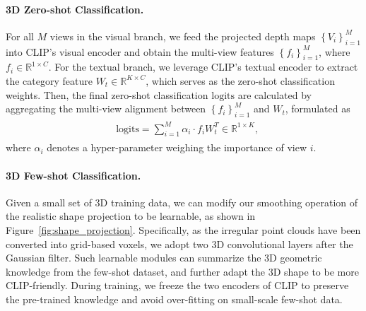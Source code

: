 \documentclass[10pt,twocolumn,letterpaper]{article}
\begin{document}
\paragraph{3D Zero-shot Classification.}
For all $M$ views in the visual branch, we feed the projected depth maps $\left\{V_{i} \right \}_{i=1}^{M}$ into CLIP's visual encoder and obtain the multi-view features $\left \{f_{i} \right \}_{i=1}^{M}$, where $f_{i} \in \mathbb{R}^{1 \times C}$.
For the textual branch, we leverage CLIP's textual encoder to extract the category feature $W_{t} \in \mathbb{R}^{K \times C}$, which serves as the zero-shot classification weights.
Then, the final zero-shot classification $\mathrm{logits}$ are calculated by aggregating the multi-view alignment between $\left \{f_{i} \right \}_{i=1}^{M}$ and $W_{t}$, formulated as
\begin{align}
\label{equa:zeroshot}
\begin{split}
    &\mathrm{logits} = \sum\nolimits_{i=1}^M{\alpha_i\cdot f_i W_t^T} \in \mathbb{R}^{1 \times K},
\end{split}
\end{align}
where $\alpha_i$ denotes a hyper-parameter weighing the importance of view $i$. 

\paragraph{3D Few-shot Classification.}
Given a small set of 3D training data, we can modify our smoothing operation of the realistic shape projection to be learnable, as shown in Figure~\ref{fig:shape_projection}. Specifically, as the irregular point clouds have been converted into grid-based voxels, we adopt two 3D convolutional layers after the Gaussian filter. Such learnable modules can summarize the 3D geometric knowledge from the few-shot dataset, and further adapt the 3D shape to be more CLIP-friendly. During training, we freeze the two encoders of CLIP to preserve the pre-trained knowledge and avoid over-fitting on small-scale few-shot data.
\end{document}
